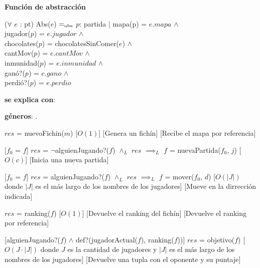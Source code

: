 \documentclass{book}
\begin{document}
    $ $

    \textbf{Función de abstracción}


        ($\forall$ $e$ : pt) Abs($e$) $=_{\mathrm{obs}}$ $p$: partida | mapa(p) = $e.mapa$ $\wedge$ \\
            \text{}\quad\qquad jugador($p$) = $e.jugador$ $\wedge$ \\
            \text{}\quad\qquad chocolates($p$) = chocolatesSinComer($e$) $\wedge$ \\
            \text{}\quad\qquad cantMov($p$) = $e.cantMov$ $\wedge$ \\
            \text{}\quad\qquad inmunidad($p$) = $e.inmunidad$ $\wedge$ \\
            \text{}\quad\qquad ganó?($p$) = $e.gano$ $\wedge$ \\
            \text{}\quad\qquad perdió?($p$) = $e.perdio$

    \newpage

    \begin{Interfaz}

        \textbf{se explica con}: 

        \textbf{géneros}: .


        {$res$ = nuevoFichin($m$)}%
        [$O(1)$]
        [Genera un fichín]
        [Recibe el mapa por referencia]

        [$f_0$ = $f$]
        {$res$ = $\neg$alguienJugando?($f$) $\wedge_L$ $res$ $\implies_L$ $f$ = nuevaPartida($f_0$, $j$) }%
        [$O(c)$]
        [Inicia una nueva partida]

        [$f_0$ = $f$]
        {$res$ = alguienJugando?($f$) $\wedge_L$ $res$ $\implies_L$ $f$ = mover($f_0$, $d$) }%
        [$O(|J|)$ donde $|J|$ es el más largo de los nombres de los jugadores]
        [Mueve en la dirrección indicada]

        {$res$ = ranking($f$)}%
        [$O(1)$]
        [Devuelve el ranking del fichín]
        [Devuelve el ranking por referencia]

        [alguienJugando?($f$) $\wedge$ def?(jugadorActual($f$), ranking($f$))]
        {$res$ = objetivo($f$) }%
        [$O(J \cdot |J|)$ donde $J$ es la cantidad de jugadores y $|J|$ es el más largo de los nombres de los jugadores]
        [Devuelve una tupla con el oponente y su puntaje]

    \end{Interfaz}
\end{document}
